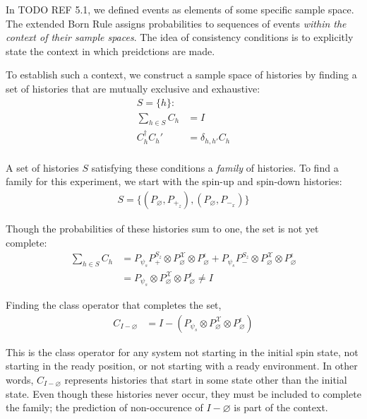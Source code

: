In TODO REF 5.1, we defined events as elements of some specific sample space. The extended Born Rule assigns probabilities to sequences of events \textit{within the context of their sample spaces}. The idea of consistency conditions is to explicitly state the context in which preidctions are made.

To establish such a context, we construct a sample space of histories by finding a set of histories that are mutually exclusive and exhaustive:
\begin{align}
  S = \{h \}: \\ \nonumber
  \sum_{h \in S} C_h &= I \\ \nonumber
  C_h^\dagger C_h' &= \delta_{h,h'} C_h \\
\end{align}

A set of histories $S$ satisfying these conditions a \textit{family} of histories. To find a family for this experiment, we start with the spin-up and spin-down histories:
\begin{align}
  S = \{ \left(P_\varnothing, P_{+_z} \right), \left(P_\varnothing, P_{-_x} \right)\}
\end{align}

Though the probabilities of these histories sum to one, the set is not yet complete:
\begin{align}
  \sum_{h \in S} C_h &= P_{\psi_s} P^{S_z}_+ \otimes P^\mathcal{X}_\varnothing \otimes P^\epsilon_\varnothing + P_{\psi_s} P^{S_z}_- \otimes P^\mathcal{X}_\varnothing \otimes P^\epsilon_\varnothing \\ \nonumber
  &= P_{\psi_s} \otimes P^\mathcal{X}_\varnothing \otimes P^\epsilon_\varnothing \neq I
\end{align}

Finding the class operator that completes the set,
\begin{align}
  C_{I-\varnothing} &= I - \left(P_{\psi_s} \otimes P^\mathcal{X}_\varnothing \otimes P^\epsilon_\varnothing \right)
\end{align}

This is the class operator for any system not starting in the initial spin state, not starting in the ready position, or not starting with a ready environment. In other words, $C_{I-\varnothing}$ represents histories that start in some state other than the initial state. Even though these histories never occur, they must be included to complete the family; the prediction of non-occurence of $I - \varnothing$ is part of the context.

